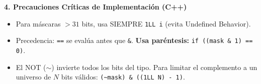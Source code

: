 \textbf{4. Precauciones Críticas de Implementación (C++)}
\begin{itemize}
    \item Para máscaras $> 31$ bits, usa SIEMPRE \texttt{1LL \ll i} (evita Undefined Behavior).
    \item Precedencia: \texttt{==} se evalúa antes que \texttt{\&}. \textbf{Usa paréntesis:} \texttt{if ((mask \& 1) == 0)}.
    \item El NOT ($\sim$) invierte todos los bits del tipo. Para limitar el complemento a un universo de $N$ bits válidos: \texttt{(\sim mask) \& ((1LL \ll N) - 1)}.
\end{itemize}